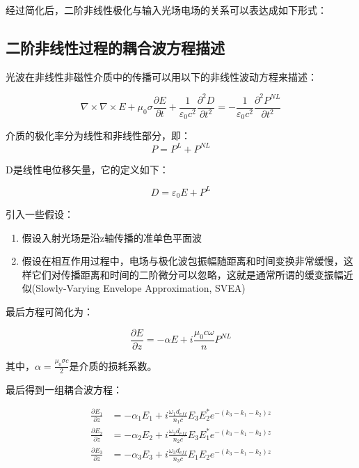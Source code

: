 \documentclass[a4paper,UTF8]{ctexart}
\begin{document}
经过简化后，二阶非线性极化与输入光场电场的关系可以表达成如下形式：



\subsection{二阶非线性过程的耦合波方程描述}

光波在非线性非磁性介质中的传播可以用以下的非线性波动方程来描述：

\begin{equation}
   \nabla \times \nabla \times E + \mu_0 \sigma \frac{\partial E}{\partial t} + \frac{1}{\varepsilon_0 c^2} \frac{\partial^2 D}{\partial t^2} = -\frac{1}{\varepsilon_0 c^2} \frac{\partial^2 P^{NL}}{\partial t^2} 
\end{equation}

介质的极化率分为线性和非线性部分，即：
\begin{equation}
    P = P^{L} + P^{NL}
\end{equation}

D是线性电位移矢量，它的定义如下：

\begin{equation}
    D = \varepsilon_0 E + P^L
\end{equation}

引入一些假设：

\begin{enumerate}
    \item 假设入射光场是沿z轴传播的准单色平面波
    \item 假设在相互作用过程中，电场与极化波包振幅随距离和时间变换非常缓慢，这样它们对传播距离和时间的二阶微分可以忽略，这就是通常所谓的缓变振幅近似(Slowly-Varying Envelope Approximation, SVEA)
\end{enumerate}

最后方程可简化为：

\begin{equation}
    \frac{\partial E}{\partial z} = - \alpha E + i \frac{\mu_0c\omega}{n}P^{NL}
\end{equation}

其中，$\alpha = \frac{\mu_0\sigma c }{2}$是介质的损耗系数。

最后得到一组耦合波方程：

\begin{align}
    \frac{\partial E_1}{\partial z} &= -\alpha_1 E_1 + i \frac{\omega_1d_{eff}}{n_1c}E_3E_2^{*}e^{-(k_3-k_1-k_2)z} \\
    \frac{\partial E_2}{\partial z} &= -\alpha_2 E_2 + i \frac{\omega_2d_{eff}}{n_2c}E_3E_1^{*}e^{-(k_3-k_1-k_2)z} \\
    \frac{\partial E_3}{\partial z} &= -\alpha_3 E_3 + i \frac{\omega_3d_{eff}}{n_3c}E_1E_2e^{-(k_3-k_1-k_2)z}
\end{align}
\end{document}

